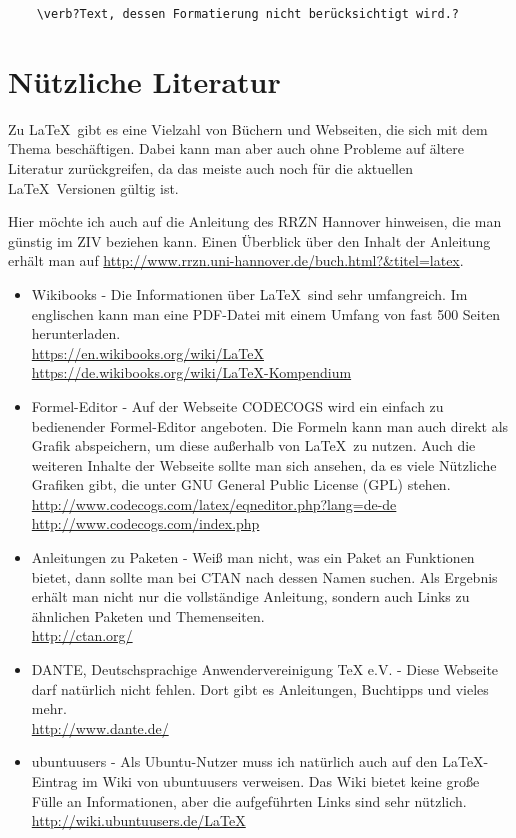 \begin{verbatim}
    \verb?Text, dessen Formatierung nicht berücksichtigt wird.?
\end{verbatim}

\newpage
\chapter{Nützliche Literatur}

Zu \LaTeX\ gibt es eine Vielzahl von Büchern und Webseiten, die sich mit dem Thema beschäftigen. Dabei kann man aber auch ohne Probleme auf ältere Literatur zurückgreifen, da das meiste auch noch für die aktuellen \LaTeX\ Versionen gültig ist.

Hier möchte ich auch auf die Anleitung des RRZN Hannover hinweisen, die man günstig im ZIV beziehen kann. Einen Überblick über den Inhalt der Anleitung erhält man auf \url{http://www.rrzn.uni-hannover.de/buch.html?&titel=latex}.

\begin{itemize}
    \item Wikibooks - Die Informationen über \LaTeX\ sind sehr umfangreich. Im englischen kann man eine PDF-Datei mit einem Umfang von fast 500 Seiten herunterladen.\\
    \url{https://en.wikibooks.org/wiki/LaTeX}\\
    \url{https://de.wikibooks.org/wiki/LaTeX-Kompendium}
    \item Formel-Editor - Auf der Webseite CODECOGS wird ein einfach zu bedienender Formel-Editor angeboten. Die Formeln kann man auch direkt als Grafik abspeichern, um diese außerhalb von \LaTeX\ zu nutzen. Auch die weiteren Inhalte der Webseite sollte man sich ansehen, da es viele Nützliche Grafiken gibt,
    die unter GNU General Public License (GPL) stehen.\\
    \url{http://www.codecogs.com/latex/eqneditor.php?lang=de-de}\\
    \url{http://www.codecogs.com/index.php}
    \item Anleitungen zu Paketen - Weiß man nicht, was ein Paket an Funktionen bietet, dann sollte man bei CTAN nach dessen Namen suchen. Als Ergebnis erhält man nicht nur die vollständige Anleitung, sondern auch Links zu ähnlichen Paketen und Themenseiten.\\
    \url{http://ctan.org/}
    \item DANTE, Deutschsprachige Anwendervereinigung TeX e.V. - Diese Webseite darf natürlich nicht fehlen. Dort gibt es Anleitungen, Buchtipps und vieles mehr.\\
    \url{http://www.dante.de/}
    \item ubuntuusers - Als Ubuntu-Nutzer muss ich natürlich auch auf den \LaTeX-Eintrag im Wiki von ubuntuusers verweisen. Das Wiki bietet keine große Fülle an Informationen, aber die aufgeführten Links sind sehr nützlich.\\
    \url{http://wiki.ubuntuusers.de/LaTeX}
\end{itemize}

